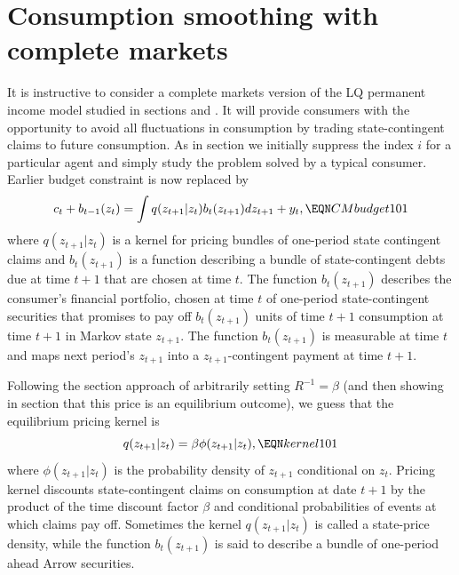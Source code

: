 \section{Consumption smoothing with complete markets}\label{sec:LQcomplete}%
It is instructive to consider a complete markets
version of the LQ permanent income model 
studied in sections  and 
. It will provide  
consumers  with the opportunity
to avoid all fluctuations in consumption by trading state-contingent claims to future consumption. As in
section  we initially suppress the 
index $i$ for a particular agent and simply study
the  problem solved by a typical consumer. 
Earlier budget constraint  is now replaced by
$$ c_t + b_{t-1}(z_t) = \int  q(z_{t+1} | z_t ) b_t(z_{t+1}) 
d z_{t+1} + y_t , \EQN CMbudget101 $$
where $q(z_{t+1} | z_t)$ is a  kernel for pricing bundles of  one-period  state contingent claims and $b_t(z_{t+1})$ is 
a function describing a bundle of state-contingent debts 
due at time $t+1$ that are chosen at time $t$. The 
function $b_{t}(z_{t+1})$ describes the consumer's financial portfolio, chosen  at time $t$ of one-period state-contingent
securities  that promises to pay off $b_{t}(z_{t+1})$ units 
of time $t+1$ consumption at time $t+1$ in Markov state 
$z_{t+1}$. The function  
$b_{t}(z_{t+1})$
is measurable at time $t$ and maps next period's 
$z_{t+1}$
into a $z_{t+1}$-contingent payment 
at time $t+1$.

Following the section  approach  of
arbitrarily setting $R^{-1}=\beta$ (and then showing in
section  that this price is an 
equilibrium outcome), we guess that the equilibrium 
pricing kernel is 
$$ q(z_{t+1} | z_t ) = \beta \phi(z_{t+1} | z_t) , \EQN kernel101 $$
where $\phi(z_{t+1} | z_t)$ is the probability density of 
$z_{t+1}$ conditional on $z_t$. 
Pricing kernel  discounts state-contingent claims on consumption at date $t+1$ by the product of the time  discount factor $\beta$ and  conditional probabilities of    events
at which  claims pay off. 
Sometimes the kernel $q(z_{t+1} | z_t)$ is called  a state-price density,
while  the function $b_t(z_{t+1})$ is said to describe a bundle of one-period ahead Arrow securities.


